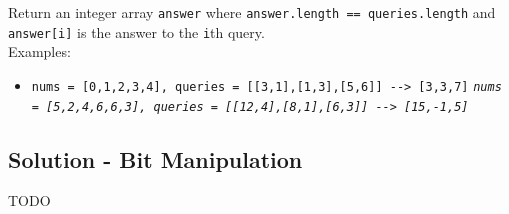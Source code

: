 Return an integer array {\colorbox{CodeBackground}{\lstinline|answer|}} where {\colorbox{CodeBackground}{\lstinline|answer.length == queries.length|}} and {\colorbox{CodeBackground}{\lstinline|answer[i]|}} is the answer to the {\colorbox{CodeBackground}{\lstinline|i|}}th query.\\

Examples:
\begin{itemize}
\item {\colorbox{CodeBackground}{\lstinline|nums = [0,1,2,3,4], queries = [[3,1],[1,3],[5,6]] --> [3,3,7]|}}
\textit{{\colorbox{CodeBackground}{\lstinline|nums = [5,2,4,6,6,3], queries = [[12,4],[8,1],[6,3]] --> [15,-1,5]|}}}
\end{itemize}

\subsection*{Solution - Bit Manipulation}
TODO